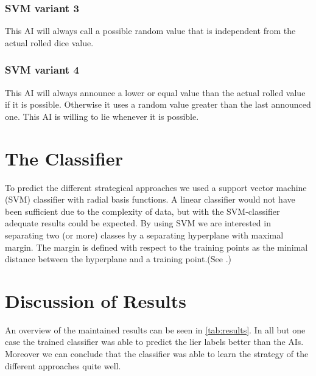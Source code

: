 \documentclass[11pt]{article}
\begin{document}
\subsubsection{SVM variant 3}
\label{sssec:svm3}
This AI will always call a possible random value that is independent from the actual rolled dice value.

\subsubsection{SVM variant 4}
\label{sssec:svm4}
This AI will always announce a lower or equal value than the actual rolled value if it is possible. Otherwise it uses a random value greater than the last announced one. This AI is willing to lie whenever it is possible. 

\section{The Classifier}
\label{sec:predictor}
To predict the different strategical approaches we used a support vector machine (SVM) classifier with radial basis functions. A linear classifier would not have been sufficient due to the complexity of data, but with the SVM-classifier adequate results could be expected.
By using SVM we are interested in separating two (or more) classes by a separating hyperplane with maximal margin. The margin is defined with respect to the training points as the minimal distance between the hyperplane and a training point.(See \cite[187--227]{Schoellkopf:02}.)

\section{Discussion of Results}
\label{secDiscussionOfResults}
An overview of the maintained results can be seen in \cref{tab:results}.
In all but one case the trained classifier was able to predict the lier labels better than the AIs. Moreover we can conclude that the classifier was able to learn the strategy of the different approaches quite well. 
\end{document}
